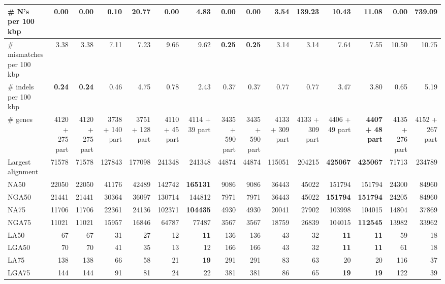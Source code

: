 \documentclass[12pt,a4paper]{article}
\begin{document}
\begin{table}[ht]
\begin{center}
\begin{tabular}{|l*{14}{|r}|}
\# N's per 100 kbp & {\bf 0.00} & {\bf 0.00} & 0.10 & 20.77 & {\bf 0.00} & 4.83 & {\bf 0.00} & {\bf 0.00} & 3.54 & 139.23 & 10.43 & 11.08 & {\bf 0.00} & 739.09 \\ \hline
\# mismatches per 100 kbp & 3.38 & 3.38 & 7.11 & 7.23 & 9.66 & 9.62 & {\bf 0.25} & {\bf 0.25} & 3.14 & 3.14 & 7.64 & 7.55 & 10.50 & 10.75 \\ \hline
\# indels per 100 kbp & {\bf 0.24} & {\bf 0.24} & 0.46 & 4.75 & 0.78 & 2.43 & 0.37 & 0.37 & 0.77 & 0.77 & 3.47 & 3.80 & 0.65 & 5.19 \\ \hline
\# genes & 4120 + 275 part & 4120 + 275 part & 3738 + 140 part & 3751 + 128 part & 4110 + 45 part & 4114 + 39 part & 3435 + 590 part & 3435 + 590 part & 4133 + 309 part & 4133 + 309 part & 4406 + 49 part & {\bf 4407 + 48 part} & 4135 + 276 part & 4152 + 267 part \\ \hline
Largest alignment & 71578 & 71578 & 127843 & 177098 & 241348 & 241348 & 44874 & 44874 & 115051 & 204215 & {\bf 425067} & {\bf 425067} & 71713 & 234789 \\ \hline
NA50 & 22050 & 22050 & 41176 & 42489 & 142742 & {\bf 165131} & 9086 & 9086 & 36443 & 45022 & 151794 & 151794 & 24300 & 84960 \\ \hline
NGA50 & 21441 & 21441 & 30364 & 36097 & 130714 & 144812 & 7971 & 7971 & 36443 & 45022 & {\bf 151794} & {\bf 151794} & 24205 & 84960 \\ \hline
NA75 & 11706 & 11706 & 22361 & 24136 & 102371 & {\bf 104435} & 4930 & 4930 & 20041 & 27902 & 103998 & 104015 & 14804 & 37869 \\ \hline
NGA75 & 11021 & 11021 & 15957 & 16846 & 64787 & 77487 & 3567 & 3567 & 18759 & 26839 & 104015 & {\bf 112545} & 13982 & 33962 \\ \hline
LA50 & 67 & 67 & 31 & 27 & 12 & {\bf 11} & 136 & 136 & 43 & 32 & {\bf 11} & {\bf 11} & 59 & 18 \\ \hline
LGA50 & 70 & 70 & 41 & 35 & 13 & 12 & 166 & 166 & 43 & 32 & {\bf 11} & {\bf 11} & 61 & 18 \\ \hline
LA75 & 138 & 138 & 66 & 58 & 21 & {\bf 19} & 291 & 291 & 83 & 63 & 20 & 20 & 116 & 37 \\ \hline
LGA75 & 144 & 144 & 91 & 81 & 24 & 22 & 381 & 381 & 86 & 65 & {\bf 19} & {\bf 19} & 122 & 39 \\ \hline
\end{tabular}
\end{center}
\end{table}
\end{document}
